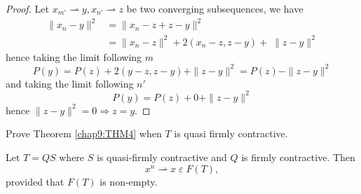 \begin{proof}
Let $x_{m'}\rightharpoonup y, x_{n'}\rightharpoonup z$ be two
converging subsequences, we have 
\begin{align*}
\parallel x_n-y\parallel^2 &= \parallel x_n-z+z-y\parallel^2\\
&= \parallel x_n-z\parallel^2+2(x_n-z,z-y)+\;\parallel z-y\parallel^2 
\end{align*}
hence taking the limit following $m$
$$
P(y)=P(z)+2(y-z, z-y)+\parallel z-y\parallel^2=P(z)-\parallel
z-y\parallel^2
$$\pageoriginale
and taking the limit following $n'$
$$
P(y)=P(z)+0+\parallel z-y\parallel^2
$$
hence $\parallel z-y\parallel^2=0\Rightarrow z=y$.  
\end{proof}

\begin{exercise}\label{chap9:exr3}
Prove Theorem \ref{chap9:THM4} when $T$ is quasi firmly contractive. 
\end{exercise}

\setcounter{THM}{5}
\begin{THM}\label{chap9:THM6}
Let $T=QS$ where $S$ is quasi-firmly contractive and $Q$ is firmly
contractive. Then 
$$
x^n\rightharpoonup x\;\varepsilon \;F(T),
$$
provided that $F(T)$ is non-empty.
\end{THM}


